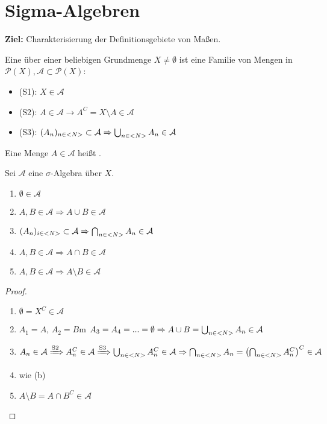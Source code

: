 \section{Sigma-Algebren}

\textbf{Ziel:} Charakterisierung der Definitionsgebiete von Maßen.

\begin{definition}
	Eine  über einer beliebigen Grundmenge $X \neq \emptyset$ ist eine Familie von Mengen in $\mathcal{P}(X), \mathcal{A} \subset \mathcal{P}(X)$:
	\begin{itemize}
		\item (S1): $X \in \mathcal{A}$
		\item (S2): $A \in \mathcal{A} \to A^C = X \setminus A \in \mathcal{A}$
		\item (S3): $(A_n)_{n\in <N>} \subset \mathcal{A} \Rightarrow \bigcup_{n\in <N>}A_n \in \mathcal{A}$
	\end{itemize}
	Eine Menge $A\in\mathcal{A}$ heißt .
\end{definition}

\begin{proposition}
	Sei $\mathcal{A}$ eine $\sigma$-Algebra über $X$.
	\begin{enumerate}[label=(\alph*)]
		\item $\emptyset\in\mathcal{A}$
		\item $A,B\in\mathcal{A}\Rightarrow A\cup B\in\mathcal{A}$
		\item $(A_n)_{i\in<N>}\subset\mathcal{A}\Rightarrow\bigcap_{n\in <N>}A_n\in\mathcal{A}$
		\item $A,B\in\mathcal{A}\Rightarrow A\cap B\in\mathcal{A}$
		\item $A,B\in\mathcal{A}\Rightarrow A\setminus B\in\mathcal{A}$
	\end{enumerate}
\end{proposition}
\begin{proof}
	\begin{enumerate}[label=(\alph*)]
		\item $\emptyset=X^C\in\mathcal{A}$
		\item $A_1=A$, $A_2=B$m $A_3=A_4=...=\emptyset\Rightarrow A\cup B=\bigcup_{n\in <N>} A_n\in\mathcal{A}$
		\item $A_n\in\mathcal{A}\xRightarrow{\text{S2}}A_n^C\in\mathcal{A}\xRightarrow{\text{S3}}\bigcup_{n\in <N>} A_n^C\in\mathcal{A}\Rightarrow\bigcap_{n\in <N>}A_n=\left(\bigcap_{n\in <N>} A_n^C\right)^C\in\mathcal{A}$
		\item wie (b)
		\item $A\setminus B=A\cap B^C\in\mathcal{A}$
	\end{enumerate}
\end{proof}

